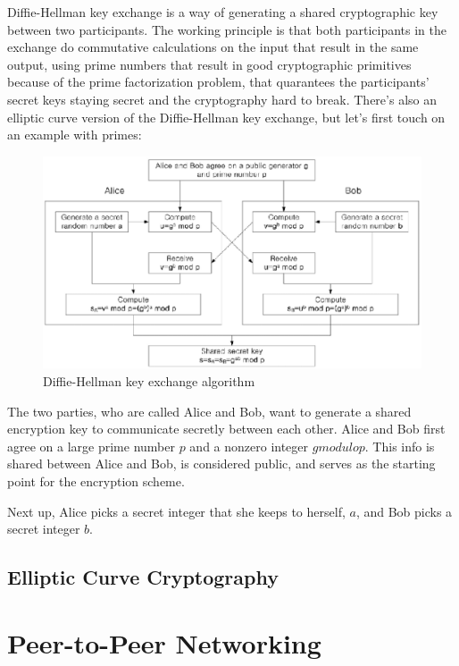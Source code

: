 Diffie-Hellman key exchange is a way of generating a shared cryptographic key between two participants. The working principle is that both participants in the exchange do commutative calculations on the input that result in the same output, using prime numbers that result in good cryptographic primitives because of the prime factorization problem, that quarantees the participants' secret keys staying secret and the cryptography hard to break. There's also an elliptic curve version of the Diffie-Hellman key exchange, but let's first touch on an example with primes:

\begin{figure}
	\includegraphics[width=\textwidth]{pictures/diffiehellman.eps}
	\caption{Diffie-Hellman key exchange algorithm\cite{Jeon2014-ag}}
	\label{Diagram, Diffie-Hellman Key Exchange}
\end{figure}

The two parties, who are called Alice and Bob, want to generate a shared encryption key to communicate secretly between each other. Alice and Bob first agree on a large prime number \(p\) and a nonzero integer \(g  modulo  p\). This info is shared between Alice and Bob, is considered public, and serves as the starting point for the encryption scheme.
						
Next up, Alice picks a secret integer that she keeps to herself, \(a\), and Bob picks a secret integer \(b\). 
						

\section{Elliptic Curve Cryptography}
						
\chapter{Peer-to-Peer Networking}
\label{Peer-to-Peer Networking}
						
